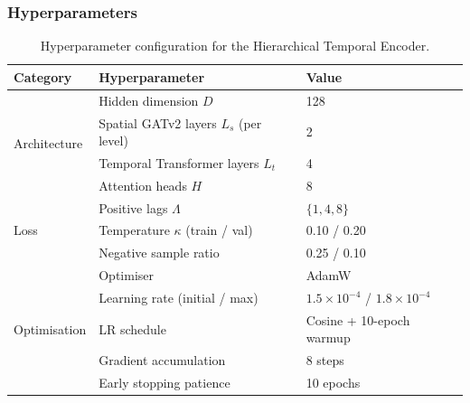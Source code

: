 \documentclass{article}
\begin{document}
\subsubsection*{Hyperparameters}

\begin{table}[htbp]
\centering
\small
\begin{tabular}{lll}
\toprule
\textbf{Category} & \textbf{Hyperparameter} & \textbf{Value} \\
\midrule
\multirow{4}{*}{Architecture}
  & Hidden dimension $D$ & 128 \\
  & Spatial GATv2 layers $L_s$ (per level) & 2 \\
  & Temporal Transformer layers $L_t$ & 4 \\
  & Attention heads $H$ & 8 \\
\midrule
\multirow{3}{*}{Loss}
  & Positive lags $\Lambda$ & $\{1, 4, 8\}$ \\
  & Temperature $\kappa$ (train / val) & 0.10 / 0.20 \\
  & Negative sample ratio & 0.25 / 0.10 \\
\midrule
\multirow{5}{*}{Optimisation}
  & Optimiser & AdamW \\
  & Learning rate (initial / max) & $1.5 \times 10^{-4}$ / $1.8 \times 10^{-4}$ \\
  & LR schedule & Cosine + 10-epoch warmup \\
  & Gradient accumulation & 8 steps \\
  & Early stopping patience & 10 epochs \\
\bottomrule
\end{tabular}
\caption{Hyperparameter configuration for the Hierarchical Temporal Encoder.}
\label{tab:hte_hyperparams}
\end{table}
\end{document}

